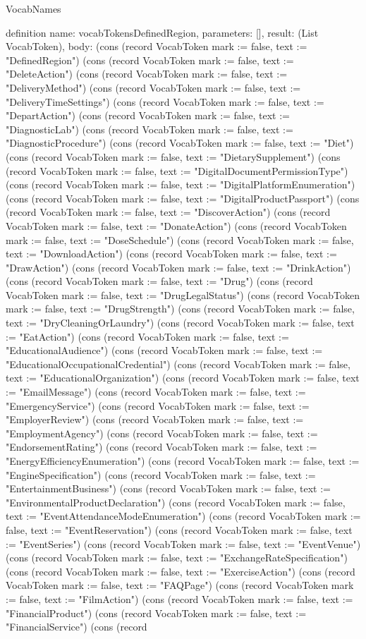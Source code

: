 \begin{lexlean}{VocabNames}
\begin{semanticmodule}
definition{
  name: vocabTokensDefinedRegion,
  parameters: [],
  result: (List VocabToken),
  body: (cons (record VocabToken {mark := false, text := "DefinedRegion"}) (cons (record VocabToken {mark := false, text := "DeleteAction"}) (cons (record VocabToken {mark := false, text := "DeliveryMethod"}) (cons (record VocabToken {mark := false, text := "DeliveryTimeSettings"}) (cons (record VocabToken {mark := false, text := "DepartAction"}) (cons (record VocabToken {mark := false, text := "DiagnosticLab"}) (cons (record VocabToken {mark := false, text := "DiagnosticProcedure"}) (cons (record VocabToken {mark := false, text := "Diet"}) (cons (record VocabToken {mark := false, text := "DietarySupplement"}) (cons (record VocabToken {mark := false, text := "DigitalDocumentPermissionType"}) (cons (record VocabToken {mark := false, text := "DigitalPlatformEnumeration"}) (cons (record VocabToken {mark := false, text := "DigitalProductPassport"}) (cons (record VocabToken {mark := false, text := "DiscoverAction"}) (cons (record VocabToken {mark := false, text := "DonateAction"}) (cons (record VocabToken {mark := false, text := "DoseSchedule"}) (cons (record VocabToken {mark := false, text := "DownloadAction"}) (cons (record VocabToken {mark := false, text := "DrawAction"}) (cons (record VocabToken {mark := false, text := "DrinkAction"}) (cons (record VocabToken {mark := false, text := "Drug"}) (cons (record VocabToken {mark := false, text := "DrugLegalStatus"}) (cons (record VocabToken {mark := false, text := "DrugStrength"}) (cons (record VocabToken {mark := false, text := "DryCleaningOrLaundry"}) (cons (record VocabToken {mark := false, text := "EatAction"}) (cons (record VocabToken {mark := false, text := "EducationalAudience"}) (cons (record VocabToken {mark := false, text := "EducationalOccupationalCredential"}) (cons (record VocabToken {mark := false, text := "EducationalOrganization"}) (cons (record VocabToken {mark := false, text := "EmailMessage"}) (cons (record VocabToken {mark := false, text := "EmergencyService"}) (cons (record VocabToken {mark := false, text := "EmployerReview"}) (cons (record VocabToken {mark := false, text := "EmploymentAgency"}) (cons (record VocabToken {mark := false, text := "EndorsementRating"}) (cons (record VocabToken {mark := false, text := "EnergyEfficiencyEnumeration"}) (cons (record VocabToken {mark := false, text := "EngineSpecification"}) (cons (record VocabToken {mark := false, text := "EntertainmentBusiness"}) (cons (record VocabToken {mark := false, text := "EnvironmentalProductDeclaration"}) (cons (record VocabToken {mark := false, text := "EventAttendanceModeEnumeration"}) (cons (record VocabToken {mark := false, text := "EventReservation"}) (cons (record VocabToken {mark := false, text := "EventSeries"}) (cons (record VocabToken {mark := false, text := "EventVenue"}) (cons (record VocabToken {mark := false, text := "ExchangeRateSpecification"}) (cons (record VocabToken {mark := false, text := "ExerciseAction"}) (cons (record VocabToken {mark := false, text := "FAQPage"}) (cons (record VocabToken {mark := false, text := "FilmAction"}) (cons (record VocabToken {mark := false, text := "FinancialProduct"}) (cons (record VocabToken {mark := false, text := "FinancialService"}) (cons (record }
\end{semanticmodule}
\end{lexlean}
